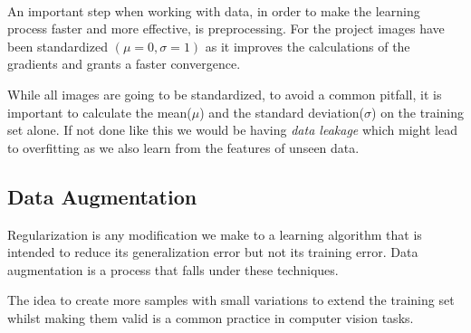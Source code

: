 
\paragraph{}
An important step when working with data, in order to make the learning process faster and more effective, is preprocessing.
For the project images have been standardized $(\mu=0, \sigma=1)$ as it improves the calculations of the gradients and grants a faster convergence.

While all images are going to be standardized, to avoid a common pitfall, it is important to calculate the mean($\mu$) and the standard deviation($\sigma$) on the training set alone.
If not done like this we would be having \textit{data leakage} which might lead to overfitting as we also learn from the features of unseen data.

\subsection{Data Augmentation}\label{subsec:data-augmentation}
Regularization is any modification we make to a learning algorithm that is intended to reduce its generalization error but not its training error.
Data augmentation is a process that falls under these techniques.\cite[Section 5.2.2]{Goodfellow-et-al-2016}

The idea to create more samples with small variations to extend the training set whilst making them valid
is a common practice in computer vision tasks.


